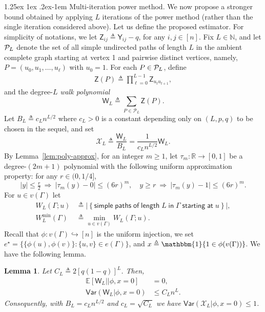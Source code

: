 \documentclass[12pt]{article}
\makeatletter
\newcommand{\bE}{\mathbb{E}}
\newtheorem{lemma}{Lemma}
\newcommand{\Ind}{\mathbbm{1}}
\newcommand{\abs}[1]{\left|#1\right|}
\newcommand{\calP}{{\cal P}}
\newcommand{\ppp}[1]{\left\{#1\right\}}
\newcommand{\s}[1]{\mathsf{#1}}
\renewcommand{\paragraph}{%
  \@startsection{paragraph}{4}%
  {\z@}{1.25ex \@plus 1ex \@minus .2ex}{-1em}%
  {\normalfont\normalsize\bfseries}%
}
\makeatother
\begin{document}
\paragraph{Multi-iteration power method.} We now propose a stronger bound obtained by applying $L$ iterations of the power method (rather than the single iteration considered above). Let us define the proposed estimator. For simplicity of notations, we let $\s{Z}_{ij}\triangleq\s{Y}_{ij}-q$, for any $i,j\in[n]$. Fix $L\in\mathbb{N}$, and let $\calP_L$ denote the set of all simple undirected paths of length $L$ in the ambient complete graph starting at vertex 1 and pairwise distinct vertices, namely, $P=(u_0,u_1,\dots,u_\ell)$ with $u_0=1$. For each $P\in\calP_L$, define
\begin{align}
    \s{Z}(P)\triangleq\prod_{\ell=0}^{L-1} \s{Z}_{u_t u_{t+1}},
\end{align}
and the degree-$L$ \emph{walk polynomial}
\begin{equation}\label{eq:def-Hl}
\s{W}_L\triangleq\sum_{P\in\mathcal{P}_L}\s{Z}(P).
\end{equation}
Let $B_L\triangleq c_L n^{L/2}$ where $c_L>0$ is a constant depending only on $(L,p,q)$ to be chosen in the sequel, and set
\begin{equation}\label{eq:def-Xl}
\mathscr{X}_L\triangleq\frac{\s{W}_L}{B_L} = \frac{1}{c_L n^{L/2}}\s{W}_L.
\end{equation}
By Lemma~\ref{lem:poly-approx}, for an integer $m\ge 1$, let $\tau_m:\mathbb{R}\to[0,1]$ be a degree-$(2m{+}1)$ polynomial with the following uniform approximation property: for any $r\in(0,1/4]$,
\begin{equation}\label{eq:tau-approx2}
|y|\leq \tfrac{r}{2}\ \Longrightarrow\ |\tau_m(y)-0|\le (6r)^m,
\quad
y\geq r\ \Longrightarrow\ |\tau_m(y)-1|\le (6r)^m.
\end{equation}
For $u\in v(\Gamma)$ let
\begin{align}
    W_L(\Gamma;u)&\triangleq\abs{\ppp{\s{simple}\;\s{paths}\;\s{of}\;\s{length}\;L\;\s{in}\;\Gamma\;\s{ starting}\;\s{at}\;u}},\\
    W_L^{\min}(\Gamma)&\triangleq\min_{u\in v(\Gamma)} W_L(\Gamma;u).
\end{align}
Recall that $\phi:v(\Gamma)\hookrightarrow[n]$ is the uniform injection, we set $e^\star=\{\{\phi(u),\phi(v)\}:\{u,v\}\in e(\Gamma)\}$, and $x\triangleq \Ind\{1\in \phi(v(\Gamma))\}$. We have the following lemma.
\begin{lemma}\label{lem:null-variance}
Let $C_L\triangleq 2[q(1-q)]^{L}$. Then,
\begin{align}
\bE[\s{W}_L\vert\vert \phi,x=0]&=0,\\
\s{Var}(\s{W}_L\vert \phi,x=0)&\leq C_Ln^{L}.
\end{align}
Consequently, with $B_L=c_L n^{L/2}$ and $c_L = \sqrt{C_L}$ we have $\s{Var}(\mathscr{X}_L\vert\phi,x=0)\le 1$.
\end{lemma}
\end{document}
